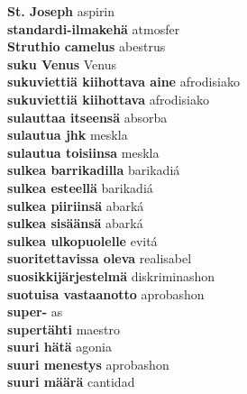 \textbf{ St. Joseph  } aspirin \\
\textbf{ standardi-ilmakehä  } atmosfer \\
\textbf{ Struthio camelus  } abestrus \\
\textbf{ suku Venus  } Venus \\
\textbf{ sukuviettiä kiihottava aine  } afrodisiako \\
\textbf{ sukuviettiä kiihottava  } afrodisiako \\
\textbf{ sulauttaa itseensä  } absorba \\
\textbf{ sulautua jhk  } meskla \\
\textbf{ sulautua toisiinsa  } meskla \\
\textbf{ sulkea barrikadilla  } barikadiá \\
\textbf{ sulkea esteellä  } barikadiá \\
\textbf{ sulkea piiriinsä  } abarká \\
\textbf{ sulkea sisäänsä  } abarká \\
\textbf{ sulkea ulkopuolelle  } evitá \\
\textbf{ suoritettavissa oleva  } realisabel \\
\textbf{ suosikkijärjestelmä  } diskriminashon \\
\textbf{ suotuisa vastaanotto  } aprobashon \\
\textbf{ super-  } as \\
\textbf{ supertähti  } maestro \\
\textbf{ suuri hätä  } agonia \\
\textbf{ suuri menestys  } aprobashon \\
\textbf{ suuri määrä  } cantidad \\
